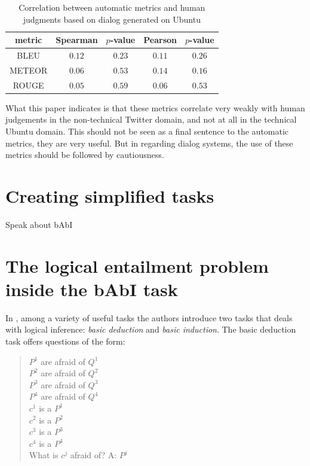\begin{table}[h]
\centering
\label{hownottable}
\begin{tabular}{|c|c|c|c|c|}
\hline
\cellcolor{blue!10} metric & \cellcolor{blue!10} Spearman & \cellcolor{blue!10} $p$-value & \cellcolor{blue!10} Pearson &  \cellcolor{blue!10} $p$-value \\ \hline
BLEU & $0.12$   & $0.23$    & $0.11$  & $0.26$    \\ \hline
METEOR & $0.06$   & $0.53$    & $0.14$  & $0.16$     \\ \hline
ROUGE & $0.05$   & $0.59$    & $0.06$  & $0.53$    \\ \hline
\end{tabular}
\caption{Correlation between automatic metrics and human judgments based on dialog generated on Ubuntu \cite{LiuLSNCP16}}
\end{table}



What this paper indicates is that these metrics correlate very weakly with human judgements in the non-technical Twitter domain, and not at all in the technical Ubuntu domain. This should not be seen as a final sentence to the automatic metrics, they are very useful. But in regarding dialog systems, the use of these metrics should be followed by cautiousness.


\section{Creating simplified tasks}
\label{ch:03-tasks}

Speak about bAbI


\section{The logical entailment problem inside the bAbI task}
\label{ch:03-tasks}


In \cite{WestonBCM15}, among a variety of useful tasks the authors introduce two tasks that deals with logical inference: \textit{basic deduction} and \textit{basic induction}. The basic deduction task offers questions of the form:

\begin{quote} 
\centering 
$P^{1}$ are afraid of $Q^{1}$\\
$P^{2}$ are afraid of $Q^{2}$\\
$P^{3}$ are afraid of $Q^{3}$\\
$P^{4}$ are afraid of $Q^{4}$\\
$c^{1}$ is a $P^{1}$\\
$c^{2}$ is a $P^{2}$\\
$c^{3}$ is a $P^{3}$\\
$c^{4}$ is a $P^{4}$\\
What is $c^j$ afraid of? A: $P^{j}$\\
\end{quote}

